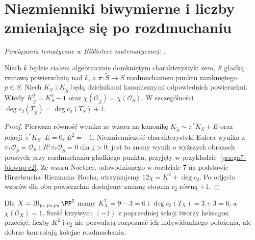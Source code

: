 \section{Niezmienniki biwymierne i liczby zmieniające się po rozdmuchaniu}
\label{sec:ga8-invariants}

\noindent\emph{Powiązania tematyczne w Bibliotece matematycznej:} .


\begin{stwierdzenie}
\label{st:ga8-classes-blowup}
Niech $k$ będzie ciałem algebraicznie domkniętym
charakterystyki zero, $S$ gładką rzutową powierzchnią
nad $k$, a $\pi:\widetilde S\to S$ rozdmuchaniem punktu
zamkniętego $p\in S$. Niech $K_S$ i
$K_{\widetilde S}$ będą dzielnikami kanonicznymi
odpowiednich powierzchni. Wtedy
$K_{\widetilde S}^2=K_S^2-1$ oraz
$\chi(\mathcal O_{\widetilde S})=\chi(\mathcal O_S)$.
W szczególności $\deg c_2(T_{\widetilde S})=
\deg c_2(T_S)+1$.
\end{stwierdzenie}
\begin{proof}
Pierwsza równość wynika ze wzoru na kanonikę
$K_{\widetilde S}\sim\pi^*K_S+E$ oraz relacji
$\pi^*K_S\cdot E=0$, $E^2=-1$.
Niezmienniczość charakterystyki Eulera wynika z
$\pi_*\mathcal O_{\widetilde S}=\mathcal O_S$
i $R^j\pi_*\mathcal O_{\widetilde S}=0$ dla $j>0$;
jest to znany wynik o wyższych obrazach prostych przy
rozdmuchaniu gładkiego punktu, przyjęty w
przykładzie~\ref{prz:ga7-blowup-c2}.
Ze wzoru Noether, udowodnionego w rozdziale 7
na podstawie Hirzebrucha--Riemanna--Rocha,
otrzymujemy $12\chi=K^2+\deg c_2$.
Po odjęciu wzorów dla obu powierzchni dostajemy
zmianę stopnia $c_2$ równą $+1$.
\end{proof}

\begin{przyklad}
Dla $X=\operatorname{Bl}_{p_1,p_2,p_3}\PP^2$
mamy $K_X^2=9-3=6$ i $\deg c_2(T_X)=3+3=6$,
a $\chi(\mathcal O_X)=1$. Sześć krzywych $(-1)$
z poprzedniej sekcji tworzy heksagon przecięć;
liczby $K^2$ i $c_2$ nie pozwalają rozpoznać
ich indywidualnego położenia, ale dobrze
kontrolują kolejne rozdmuchania.
\end{przyklad}

